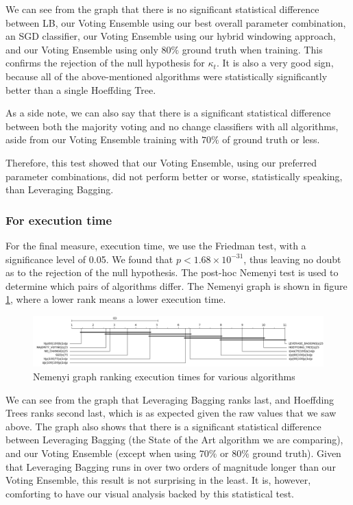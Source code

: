 We can see from the graph that there is no significant statistical difference between LB, our Voting Ensemble using our best overall parameter combination, an SGD classifier, our Voting Ensemble using our hybrid windowing approach, and our Voting Ensemble using only $80\%$ ground truth when training. This confirms the rejection of the null hypothesis for $\kappa_t$. It is also a very good sign, because all of the above-mentioned algorithms were statistically significantly better than a single Hoeffding Tree.

As a side note, we can also say that there is a significant statistical difference between both the majority voting and no change classifiers with all algorithms, aside from our Voting Ensemble training with $70\%$ of ground truth or less.

Therefore, this test showed that our Voting Ensemble, using our preferred parameter combinations, did not perform better or worse, statistically speaking, than Leveraging Bagging.

\subsubsection{For execution time}

For the final measure, execution time, we use the Friedman test, with a significance level of 0.05. We found that $p < 1.68\times10^{-31}$, thus leaving no doubt as to the rejection of the null hypothesis. The post-hoc Nemenyi test is used to determine which pairs of algorithms differ. The Nemenyi graph is shown in figure  \ref{fig:sota_compare_all_execution_time_nemenyi}, where a lower rank means a lower execution time.

\begin{figure}
  \includegraphics[width=\linewidth]{./images/chapter5/sota_compare_all_execution_time_nemenyi}
\caption{\label{fig:sota_compare_all_execution_time_nemenyi}Nemenyi graph ranking execution times for various algorithms}
\end{figure}

We can see from the graph that Leveraging Bagging ranks last, and Hoeffding Trees ranks second last, which is as expected given the raw values that we saw above. 
The graph also shows that there is a significant statistical difference between Leveraging Bagging (the State of the Art algorithm we are comparing), and our Voting Ensemble (except when using $70\%$ or $80\%$ ground truth). Given that Leveraging Bagging runs in over two orders of magnitude longer than our Voting Ensemble, this result is not surprising in the least. It is, however, comforting to have our visual analysis backed by this statistical test.

